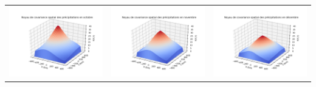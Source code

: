 \documentclass[a4paper,11pt]{article}
\begin{document}
\begin{tabular}{ccc}
	\includegraphics[scale=0.4]{images/kernel_precip_m10.png} & \includegraphics[scale=0.4]{images/kernel_precip_m11.png} & \includegraphics[scale=0.4]{images/kernel_precip_m12.png} \\
\end{tabular} 
\end{document}

